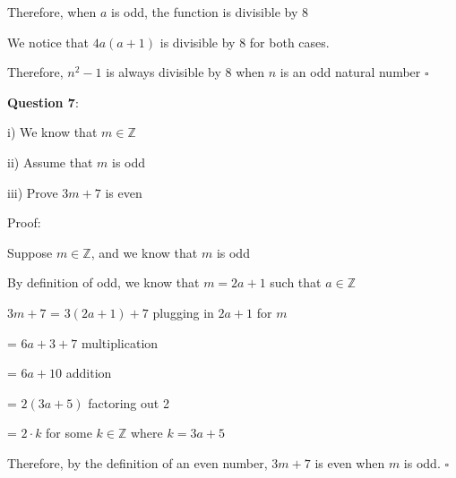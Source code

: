 \documentclass{article} %
\newcommand{\question}[2][]{\begin{flushleft}
        \textbf{Question #1}: \textit{#2}

\end{flushleft}}
\begin{document}

    Therefore, when $a$ is odd, the function is divisible by 8

    \vspace*{0.3cm}

    We notice that $4a(a+1)$ is divisible by 8 for both cases.

    Therefore, $n^2 -1$ is always divisible by 8 when $n$ is an odd natural number $\square$

                                                                     
    \question[7]{}

    i) We know that $m \in \mathbb{Z}$

    ii) Assume that $m$ is odd

    iii) Prove $3m + 7$ is even

    \vspace*{0.3cm}
    Proof:

    Suppose $m \in \mathbb{Z}$, and we know that $m$ is odd
    
    By definition of odd, we know that $m = 2a+1$ such that $a \in \mathbb{Z}$

    $3m + 7$ = $3(2a + 1) + 7$ \tabto*{5cm}plugging in $2a + 1$ for $m$

    \tabto*{1.75cm} = $6a + 3 + 7$ \tabto*{5cm}multiplication

    \tabto*{1.75cm} = $6a + 10$ \tabto*{5cm}addition

    \tabto*{1.75cm} = $2(3a + 5)$ \tabto*{5cm}factoring out 2

    \tabto*{1.75cm} = $2\cdot k$ for some $k \in \mathbb{Z}$ where $k = 3a + 5$

    Therefore, by the definition of an even number, $3m + 7$ is even when $m$ is odd. $\square$

    \newpage

                                                                    
\end{document}
